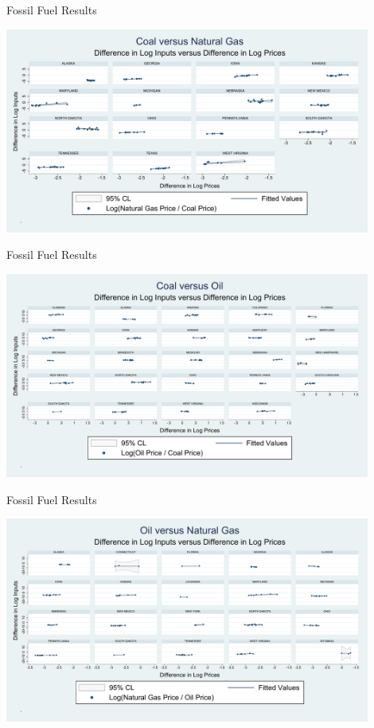\documentclass[11pt,aspectratio=169]{beamer}
\begin{document}
\begin{frame}{Fossil Fuel Results}

\begin{center}
	\includegraphics[width=0.9\textwidth]{exhibits/coal_natgas_scatter.pdf} 
\end{center}

\end{frame}


\begin{frame}{Fossil Fuel Results}

\begin{center}
	\includegraphics[width=0.9\textwidth]{exhibits/coal_oil_scatter.pdf} 
\end{center}

\end{frame}


\begin{frame}{Fossil Fuel Results}

\begin{center}
	\includegraphics[width=0.9\textwidth]{exhibits/oil_natgas_scatter.pdf} 
\end{center}

\end{frame}
\end{document}

